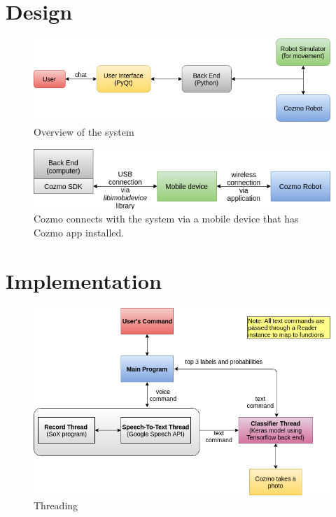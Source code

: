 \section{Design}
\begin{figure}[tb]
	\centering
	\includegraphics[width=0.9\hsize]{./figures/UIdesign}
	\caption{Overview of the system}
	\label{fig:UIdesign}
\end{figure}


\begin{figure}[tb]
	\centering
	\includegraphics[width=0.9\hsize]{./figures/CozmoConnect}
	\caption{Cozmo connects with the system via a mobile device that has Cozmo app installed.}
	\label{fig:CozmoConnect}
\end{figure}

\section{Implementation}
\begin{figure}[tb]
	\centering
	\includegraphics[width=0.9\hsize]{./figures/threads}
	\caption{Threading}
	\label{fig:threads}
\end{figure}